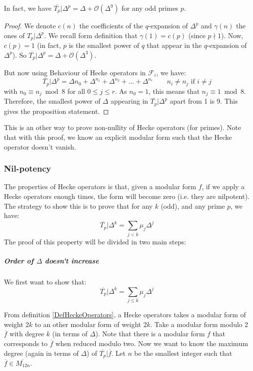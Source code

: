 \begin{property}
	In fact, we have $\overline{T_p}|\Delta^p = \Delta + \mathcal{O}(\Delta^9)$ for any odd primes $p$.
\end{property}
\begin{proof}
	We denote $c(n)$ the coefficients of the $q$-expansion of $\Delta^p$ and $\gamma(n)$ the ones of $T_p|\Delta^p$.
	We recall form definition that $\gamma(1)=c(p)$ (since $p \nmid 1$).
	Now, $c(p)=1$ (in fact, $p$ is the smallest power of $q$ that appear in the $q$-expansion of $\Delta^p$).
	So $\overline{T_p}|\Delta^p = \Delta + \mathcal{O}(\Delta^3)$.
	
	But now using Behaviour of Hecke operators in $\mathcal{F}_i$, we have:
	$$
	\overline{T_p}|\Delta^p = \Delta{n_0} + \Delta^{n_1} + \Delta^{n_2} + \dots + \Delta^{n_r} \qquad n_i \neq n_j \text{ if } i \neq j
	$$
	with $n_0 \equiv n_j \bmod 8$ for all $0 \leq j \leq r$.
	As $n_0=1$, this means that $n_j \equiv 1 \bmod 8$.
	Therefore, the smallest power of $\Delta$ appearing in $\overline{T_p}|\Delta^p$ apart from 1 is 9.
	This gives the proposition statement.
\end{proof}
This is an other way to prove non-nullity of Hecke operators (for primes).
Note that with this proof, we know an explicit modular form such that the Hecke operator doesn't vanish.



\subsubsection{Nil-potency}
\label{NilpotencyHeckeOperators}
The properties of Hecke operators is that, given a modular form $f$, if we apply a Hecke operators enough times, the form will become zero (i.e. they are nilpotent).
The strategy to show this is to prove that for any $k$ (odd), and any prime $p$, we have:
$$
\overline{T_p}| \Delta^k = \sum_{j < k} \mu_j \Delta^j
$$
The proof of this property will be divided in two main steps:

\subparagraph{Order of $\Delta$ doesn't increase}
We first want to show that:
$$
\overline{T_p}| \Delta^k = \sum_{j \leq k} \mu_j \Delta^j
$$

From definition \ref{DefHeckeOperators}, a Hecke operators takes a modular form of weight $2k$ to an other modular form of weight $2k$.
Take a modular form modulo 2 $\overline{f}$ with degree $k$ (in terms of $\Delta$).
Note that there is a modular form $f$ that corresponds to $\overline{f}$ when reduced modulo two.
Now we want to know the maximum degree (again in terms of $\Delta$) of $\overline{T_p}|\overline{f}$.
Let $n$ be the smallest integer such that $\overline{f} \in \overline{M_{12n}}$.

